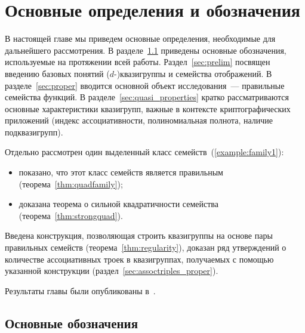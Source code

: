 \chapter{Основные определения и обозначения}
\label{sec:intro}

    В настоящей главе мы приведем основные определения, необходимые для дальнейшего рассмотрения.
    В разделе~\ref{sec:notation} приведены основные обозначения, используемые на протяжении всей работы.
    Раздел~\ref{sec:prelim} посвящен введению базовых понятий ($d$-)квазигруппы и семейства отображений.
    В разделе~\ref{sec:proper} вводится основной объект исследования~--- правильные семейства функций.
    В разделе~\ref{sec:quasi_properties} кратко рассматриваются основные характеристики квазигрупп, важные в контексте криптографических приложений (индекс ассоциативности, полиномиальная полнота, наличие подквазигрупп).

    Отдельно рассмотрен один выделенный класс семейств~(\ref{example:family1}):
    \begin{itemize}
        \item показано, что этот класс семейств является правильным (теорема~\ref{thm:quadfamily});
        \item доказана теорема о сильной квадратичности семейства (теорема~\ref{thm:strongquad}).
    \end{itemize}

    Введена конструкция, позволяющая строить квазигруппы на основе пары правильных семейств (теорема~\ref{thm:regularity}), доказан ряд утверждений о количестве ассоциативных троек в квазигруппах, получаемых с помощью указанной конструкции (раздел~\ref{sec:assoctriples_proper}).

    Результаты главы были опубликованы в~\cite{dm21, galatenko23, galatenko2023proper, tsar24}.



\section{Основные обозначения}
\label{sec:notation}

